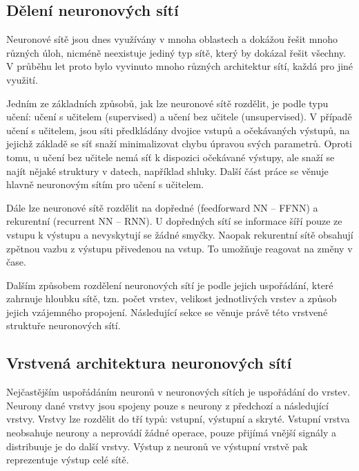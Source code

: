 
\subsection{Dělení neuronových sítí}

Neuronové sítě jsou dnes využívány v mnoha oblastech a dokážou řešit mnoho
různých úloh, nicméně neexistuje jediný typ sítě, který by dokázal řešit
všechny. V průběhu let proto bylo vyvinuto mnoho různých architektur sítí,
každá pro jiné využití.

Jedním ze základních způsobů, jak lze neuronové sítě rozdělit, je podle typu
učení: učení s učitelem (supervised) a učení bez učitele (unsupervised). V
případě učení s učitelem, jsou síti předkládány dvojice vstupů a očekávaných
výstupů, na jejichž základě se síť snaží minimalizovat chybu úpravou svých
parametrů. Oproti tomu, u učení bez učitele nemá síť k dispozici očekávané
výstupy, ale snaží se najít nějaké struktury v datech, například shluky. Další
část práce se věnuje hlavně neuronovým sítím pro učení s učitelem.

Dále lze neuronové sítě rozdělit na dopředné (feedforward NN – FFNN) a
rekurentní (recurrent NN – RNN). U dopředných sítí se informace šíří pouze ze
vstupu k výstupu a nevyskytují se žádné smyčky. Naopak rekurentní sítě obsahují
zpětnou vazbu z výstupu přivedenou na vstup. To umožňuje reagovat na změny v
čase.

Dalším způsobem rozdělení neuronových sítí je podle jejich uspořádání, které
zahrnuje hloubku sítě, tzn. počet vrstev, velikost jednotlivých vrstev a způsob
jejich vzájemného propojení. Následující sekce se věnuje právě této vrstvené
struktuře neuronových sítí.

\subsection{Vrstvená architektura neuronových sítí}
Nejčastějším uspořádáním neuronů v neuronových sítích je uspořádání do vrstev.
Neurony dané vrstvy jsou spojeny pouze s neurony z předchozí a následující
vrstvy. Vrstvy lze rozdělit do tří typů: vstupní, výstupní a skryté. Vstupní
vrstva neobsahuje neurony a neprovádí žádné operace, pouze přijímá vnější
signály a distribuuje je do další vrstvy. Výstup z neuronů ve výstupní vrstvě
pak reprezentuje výstup celé sítě.

